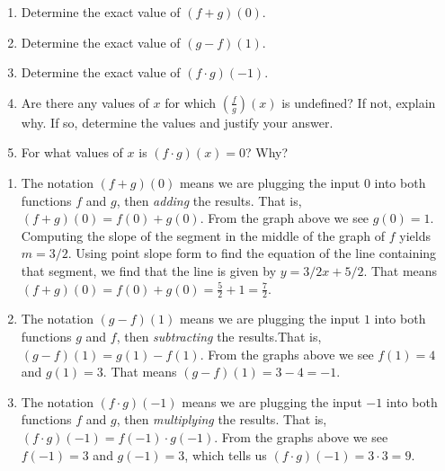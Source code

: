 \documentclass{ximera}
\begin{document}
\begin{example}
\begin{minipage}{.5\textwidth}
\begin{center}
			\end{center}
		\end{minipage}
		\begin{enumerate}
			\item Determine the exact value of $(f+g)(0)$.\\
			\item Determine the exact value of $(g-f)(1)$.\\
			\item Determine the exact value of $(f \cdot g)(-1)$.\\
			\item Are there any values of $x$ for which $\left( \frac{f}{g} \right)(x)$ is undefined?  
				If not, explain why.  If so, determine the values and justify your answer.\\
			\item For what values of $x$ is $(f \cdot g)(x) = 0$?  Why?\\
		\end{enumerate}
		\begin{explanation}
			\begin{enumerate}
				\item The notation $(f+g)(0)$ means we are plugging the input $0$ into both functions $f$ and $g$, then \emph{adding} the results.
					That is, $(f+g)(0) = f(0) + g(0)$. From the graph above we see $g(0) = 1$. Computing the slope of the segment in the middle of the graph of $f$ yields $m = 							3/2$. Using point slope form to find the equation of the line containing that segment, we find that the line is given by $y = 3/2x + 5/2$. That means
					$(f+g)(0) = f(0) + g(0) = \frac{5}{2} + 1 = \frac{7}{2}$.

				\item The notation $(g-f)(1)$ means we are plugging the input $1$ into both functions $g$ and $f$, then \emph{subtracting} the
					 results.That is, $(g-f)(1) = g(1) - f(1)$. From the graphs above we see $f(1) = 4$ and $g(1) = 3$. That means
					$(g-f)(1) = 3 - 4 = -1$.					

				\item The notation $(f\cdot g)(-1)$ means we are plugging the input $-1$ into both functions $f$ and $g$, then \emph{multiplying}
					 the results. That is, $(f\cdot g)(-1) = f(-1) \cdot g(-1)$. 
					 From the graphs above we see $f(-1) = 3$ and $g(-1) = 3$, which tells us 
					$(f\cdot g)(-1) = 3 \cdot 3 = 9$.


\end{enumerate}
\end{explanation}
\end{example}
\end{document}
